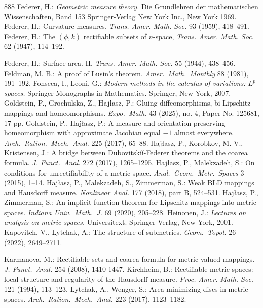 \documentclass[12pt,leqno]{amsart}
\theoremstyle{definition}
\numberwithin{theorem}{section} \numberwithin{equation}{section}
\begin{document}
\begin{thebibliography}{888}
{\sc Federer, H.:} {\em Geometric measure theory.} Die Grundlehren der mathematischen Wissenschaften,
Band 153 Springer-Verlag New York Inc., New York 1969.
%
{\sc Federer, H.:}
Curvature measures.
{\em Trans. Amer. Math. Soc.} 93 (1959), 418--491.
%
%
{\sc Federer, H.:} The $(\phi,k)$ rectifiable subsets of $n$-space,
{\em Trans. Amer. Math. Soc.} 62 (1947), 114--192.

{\sc Federer, H.:}
 Surface area. II.
{\em Trans. Amer. Math. Soc.} 55 (1944), 438--456.
%
{\sc Feldman, M. B.:}
A proof of Lusin's theorem.
{\em Amer.\ Math.\ Monthly} 88 (1981), 191--192.
%
{\sc Fonseca, I., Leoni, G.:}
{\em Modern methods in the calculus of variations: $L^p$ spaces.}
Springer Monographs in Mathematics. Springer, New York, 2007.
%
{\sc Goldstein, P., Grochulska, Z., Haj\l{}asz, P.:}
Gluing diffeomorphisms, bi-Lipschitz mappings and homeomorphisms.
{\em Expo.\ Math.} 43 (2025), no. 4, Paper No. 125681, 17 pp.
%
{\sc Goldstein, P., Haj\l{}asz, P.:}
A measure and orientation preserving homeomorphism with approximate Jacobian equal $-1$ almost everywhere. {\em Arch.\ Ration.\ Mech.\ Anal.} 225 (2017), 65--88.
%
{\sc Haj\l{}asz, P., Korobkov, M. V., Kristensen, J.:}
A bridge between Dubovitskiĭ-Federer theorems and the coarea formula.
{\em J. Funct.\ Anal.} 272 (2017), 1265--1295.
%
{\sc Haj\l{}asz, P., Malekzadeh, S.:} On conditions for unrectifiability of a metric space. {\em Anal.\ Geom.\ Metr.\ Spaces} 3 (2015), 1--14.
%
{\sc Haj\l{}asz, P., Malekzadeh, S., Zimmerman, S.:} Weak BLD mappings and Hausdorff measure. {\em Nonlinear Anal.} 177 (2018), part B, 524--531.
%
{\sc Haj\l{}asz, P., Zimmerman, S.:} An implicit function theorem for Lipschitz mappings into metric spaces.
{\em  Indiana Univ.\ Math.\ J.} 69 (2020), 205--228.
%
{\sc Heinonen, J.:}
{\em Lectures on analysis on metric spaces.} Universitext. Springer-Verlag, New York, 2001.
%
{\sc Kapovitch, V., Lytchak, A.:}
The structure of submetries. {\em Geom.\ Topol.} 26 (2022), 2649--2711.
%

{\sc  Karmanova, M.:}
Rectifiable sets and coarea formula for metric-valued mappings. {\em J. Funct.\ Anal.} 254 (2008), 1410-1447.
%
%
{\sc Kirchheim, B.:}  Rectifiable metric spaces: local structure and regularity of the Hausdorff measure. {\em Proc. Amer. Math. Soc.} 121 (1994), 113--123.
%
{\sc Lytchak, A., Wenger, S.:} Area minimizing discs in metric spaces. {\em Arch.\ Ration.\ Mech.\ Anal.} 223 (2017), 1123--1182.


\end{thebibliography}
\end{document}
